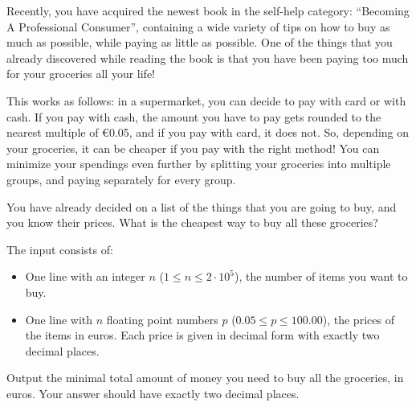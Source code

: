 \problemname{}


\newcommand{\groceryMaxN}{2 \cdot 10^5}
\newcommand{\groceryMaxP}{100.00}

Recently, you have acquired the newest book in the self-help category: ``Becoming A Professional Consumer'',
containing a wide variety of tips on how to buy as much as possible, while paying as little as possible.
One of the things that you already discovered while reading the book is that you have been paying too much for your groceries all your life!

This works as follows:
in a supermarket, you can decide to pay with card or with cash.
If you pay with cash, the amount you have to pay gets rounded to the nearest multiple of €0.05,
and if you pay with card, it does not.
So, depending on your groceries, it can be cheaper if you pay with the right method!
You can minimize your spendings even further by splitting your groceries into multiple groups, and paying separately for every group.

You have already decided on a list of the things that you are going to buy, and you know their prices.
What is the cheapest way to buy all these groceries?

\begin{Input}
    The input consists of:
    \begin{itemize}
        \item One line with an integer $n$ ($1 \leq n \leq \groceryMaxN$),
            the number of items you want to buy.
        \item One line with $n$ floating point numbers $p$ ($0.05 \leq p \leq \groceryMaxP$), the prices of the items in euros.
            Each price is given in decimal form\footnotemark[1]{} with exactly two decimal places.
    \end{itemize}
\end{Input}

\begin{Output}
    Output the minimal total amount of money you need to buy all the groceries, in euros.
    Your answer should have exactly two decimal places.
\end{Output}
